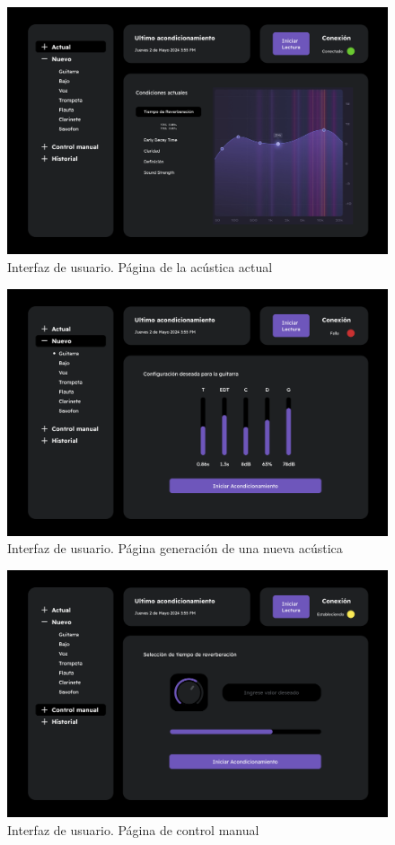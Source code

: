 \hfill\break
\begin{figure}[!htb]
    \centering
    \includegraphics[width=0.8\linewidth]{imagenes/Landing.png}
    \caption{\footnotesize Interfaz de usuario. Página de la acústica actual}
    \label{fig:DecayCurve}
\end{figure}
\FloatBarrier

\hfill\break
\begin{figure}[!htb]
    \centering
    \includegraphics[width=0.8\linewidth]{imagenes/Guitarra.png}
    \caption{\footnotesize Interfaz de usuario. Página generación de una nueva acústica}
    \label{fig:DecayCurve}
\end{figure}
\FloatBarrier

\hfill\break
\begin{figure}[!htb]
    \centering
    \includegraphics[width=\linewidth]{imagenes/Control Manual.png}
    \caption{\footnotesize Interfaz de usuario. Página de control manual}
    \label{fig:DecayCurve}
\end{figure}
\FloatBarrier

